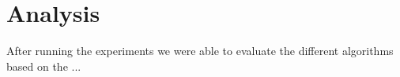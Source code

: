 \section{Analysis}
\label{sec:analysis}
After running the experiments we were able to evaluate the different algorithms based on the ...
